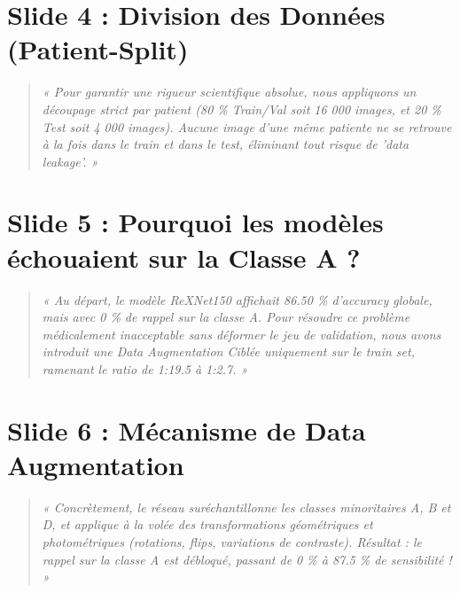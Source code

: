 \documentclass[11pt, a4paper]{article}
\begin{document}
\section{Slide 4 : Division des Données (Patient-Split)}
\begin{quote}
    \textit{« Pour garantir une rigueur scientifique absolue, nous appliquons un découpage strict par patient (80 \% Train/Val soit 16 000 images, et 20 \% Test soit 4 000 images). Aucune image d'une même patiente ne se retrouve à la fois dans le train et dans le test, éliminant tout risque de 'data leakage'. »}
\end{quote}

\section{Slide 5 : Pourquoi les modèles échouaient sur la Classe A ?}
\begin{quote}
    \textit{« Au départ, le modèle ReXNet150 affichait 86.50 \% d'accuracy globale, mais avec 0 \% de rappel sur la classe A. Pour résoudre ce problème médicalement inacceptable sans déformer le jeu de validation, nous avons introduit une Data Augmentation Ciblée uniquement sur le train set, ramenant le ratio de 1:19.5 à 1:2.7. »}
\end{quote}

\section{Slide 6 : Mécanisme de Data Augmentation}
\begin{quote}
    \textit{« Concrètement, le réseau suréchantillonne les classes minoritaires A, B et D, et applique à la volée des transformations géométriques et photométriques (rotations, flips, variations de contraste). Résultat : le rappel sur la classe A est débloqué, passant de 0 \% à 87.5 \% de sensibilité ! »}
\end{quote}

\end{document}
